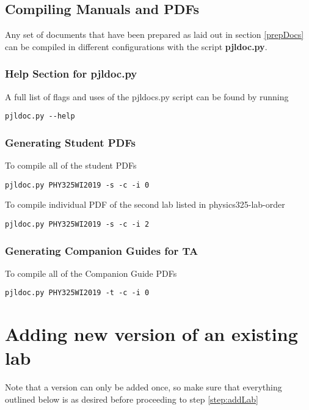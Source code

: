 \documentclass[justified]{LabArx3_5_1}
\begin{document}
\subsection{Compiling Manuals and PDFs}

Any set of documents that have been prepared as laid out in section \ref{prepDocs} can be compiled in different configurations with the script {\bf pjldoc.py}.

\subsubsection{Help Section for pjldoc.py}

A full list of flags and uses of the pjldocs.py script can be found by running 

\begin{lstlisting}
pjldoc.py --help       
\end{lstlisting}


\subsubsection{Generating Student PDFs}

To compile all of the student PDFs

\begin{lstlisting}
pjldoc.py PHY325WI2019 -s -c -i 0        
\end{lstlisting}


To compile individual PDF of the second lab listed in physics325-lab-order

\begin{lstlisting}
pjldoc.py PHY325WI2019 -s -c -i 2
\end{lstlisting}

\subsubsection{Generating Companion Guides for TA}

To compile all of the Companion Guide PDFs

\begin{lstlisting}
pjldoc.py PHY325WI2019 -t -c -i 0        
\end{lstlisting}


\section{Adding new version of an existing lab}

Note that a version can only be added once, so make sure that everything outlined below is as desired before proceeding to step \ref{step:addLab}
\end{document}
